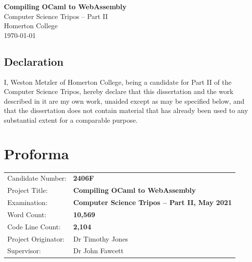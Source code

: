 \documentclass[12pt,a4paper,twoside,openright]{report}
\begin{document}





\pagestyle{empty}


\vspace*{60mm}
\begin{center}
\Huge
\textbf{Compiling OCaml to WebAssembly} \\[5mm]
Computer Science Tripos -- Part II \\[5mm]
Homerton College \\[5mm]
\today  %
\end{center}


\pagestyle{plain}

\newpage
\section*{Declaration}

I, Weston Metzler of Homerton College, being a candidate for Part II of the Computer
Science Tripos, hereby declare that this dissertation and the work described in
it are my own work, unaided except as may be specified below, and that the
dissertation does not contain material that has already been used to any substantial
extent for a comparable purpose.

\bigskip
{}

\medskip
{}

\chapter*{Proforma}

\vspace{-1.5em}
{\large
\begin{tabular}{ll}
Candidate Number:   & \bf 2406F                       \\
Project Title:      & \bf Compiling OCaml to WebAssembly         \\
Examination:        & \bf Computer Science Tripos -- Part II, May 2021  \\
Word Count:         & \bf 10,569 \\
Code Line Count:    & \bf 2,104 \\
Project Originator: & Dr Timothy Jones                    \\
Supervisor:         & Dr John Fawcett                    \\
\end{tabular}
}
\end{document}
